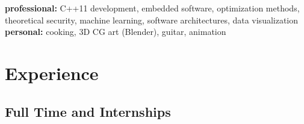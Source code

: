 \documentclass[]{friggeri-cv} %
\begin{document}
\textbf{professional:} C++11 development, embedded software, optimization methods, theoretical security, machine learning, software architectures, data visualization \\ \textbf{personal:} cooking, 3D CG art (Blender), guitar, animation 



\section{Experience}

\subsection{Full Time and Internships}
\end{document}

